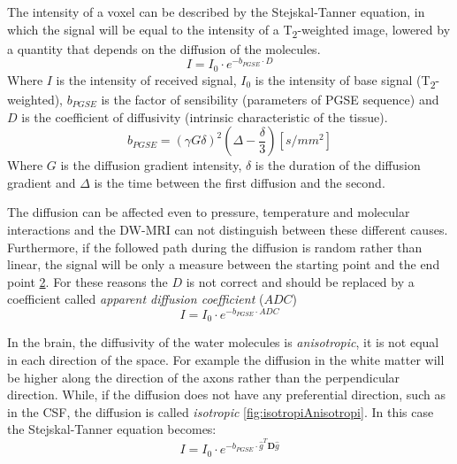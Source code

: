  The intensity of a voxel can be described by the Stejskal-Tanner equation, in which the signal will be equal to the intensity of a T\textsubscript{2}-weighted image, lowered by a quantity that depends on the diffusion of the molecules.
 \begin{equation}
    I = I_0 \cdot e^{-b_{PGSE} \cdot D}
 \end{equation}
 Where $I$ is the intensity of received signal, $I_0$ is the intensity of base signal (T\textsubscript{2}-weighted), $b_{PGSE}$ is the factor of sensibility (parameters of PGSE sequence) and $D$ is the coefficient of diffusivity (intrinsic characteristic of the tissue).
 \begin{equation}
    b_ {PGSE} = (\gamma G \delta)^{2}(\Delta - \frac{\delta}{3}) [s/mm^2]
 \end{equation}
 Where $G$ is the diffusion gradient intensity, $\delta$ is the duration of the diffusion gradient and $\Delta$ is the time between the first diffusion and the second.

 \begin{figure}[h]
    \centering
    \caption{}
    \label{fig:PGSE}
 \end{figure}

 The diffusion can be affected even to pressure, temperature and molecular interactions and the DW-MRI can not distinguish between these different causes. Furthermore, if the followed path during the diffusion is random rather than linear, the signal will be only a measure between the starting point and the end point \ref{fig:displacement_dMRI}. For these reasons the $D$ is not correct and should be replaced by a coefficient called \emph{apparent diffusion coefficient} ($ADC$)
 \begin{equation}
    I = I_0 \cdot e^{-b_{PGSE} \cdot ADC}
 \end{equation}

 \begin{figure}[h]
    \centering
    \caption{}
    \label{fig:displacement_dMRI}
 \end{figure}

 In the brain, the diffusivity of the water molecules is \emph{anisotropic}, it is not equal in each direction of the space. For example the diffusion in the white matter will be higher along the direction of the axons rather than the perpendicular direction. While, if the diffusion does not have any preferential direction, such as in the CSF, the diffusion is called \emph{isotropic} \ref{fig:isotropiAnisotropi}. In this case the Stejskal-Tanner equation becomes:
 \begin{equation}
    I = I_0 \cdot e^{-b_{PGSE} \cdot \hat{g}^T\mathbf{D}\hat{g}}
 \end{equation}

